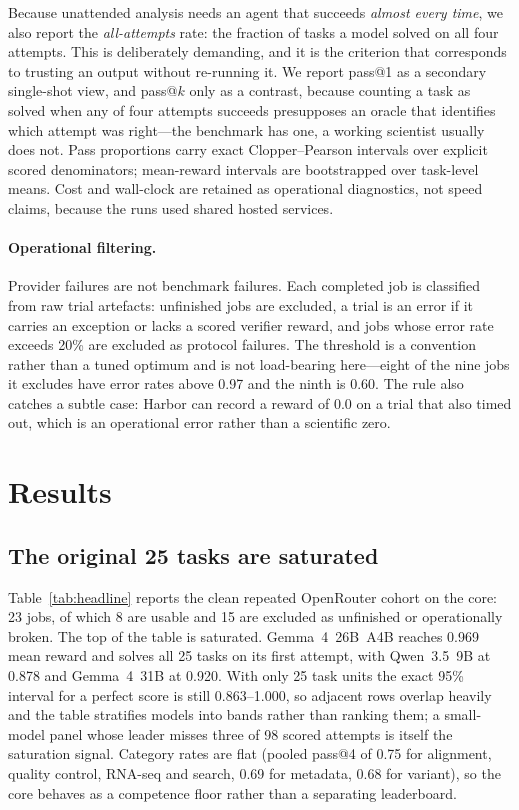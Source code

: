 \documentclass[11pt]{article}
\begin{document}
Because unattended analysis needs an agent that succeeds \emph{almost every time}, we also report the \emph{all-attempts} rate: the fraction of tasks a model solved on all four attempts.
This is deliberately demanding, and it is the criterion that corresponds to trusting an output without re-running it.
We report pass@1 as a secondary single-shot view, and pass@$k$ only as a contrast, because counting a task as solved when any of four attempts succeeds presupposes an oracle that identifies which attempt was right---the benchmark has one, a working scientist usually does not.
Pass proportions carry exact Clopper--Pearson intervals over explicit scored denominators; mean-reward intervals are bootstrapped over task-level means.
Cost and wall-clock are retained as operational diagnostics, not speed claims, because the runs used shared hosted services.

\paragraph{Operational filtering.}
Provider failures are not benchmark failures.
Each completed job is classified from raw trial artefacts: unfinished jobs are excluded, a trial is an error if it carries an exception or lacks a scored verifier reward, and jobs whose error rate exceeds 20\% are excluded as protocol failures.
The threshold is a convention rather than a tuned optimum and is not load-bearing here---eight of the nine jobs it excludes have error rates above 0.97 and the ninth is 0.60.
The rule also catches a subtle case: Harbor can record a reward of 0.0 on a trial that also timed out, which is an operational error rather than a scientific zero.

\section{Results}
\label{sec:results}

\subsection*{The original 25 tasks are saturated}

Table~\ref{tab:headline} reports the clean repeated OpenRouter cohort on the core: 23 jobs, of which 8 are usable and 15 are excluded as unfinished or operationally broken.
The top of the table is saturated.
Gemma~4~26B~A4B reaches 0.969 mean reward and solves all 25 tasks on its first attempt, with Qwen~3.5~9B at 0.878 and Gemma~4~31B at 0.920.
With only 25 task units the exact 95\% interval for a perfect score is still 0.863--1.000, so adjacent rows overlap heavily and the table stratifies models into bands rather than ranking them; a small-model panel whose leader misses three of 98 scored attempts is itself the saturation signal.
Category rates are flat (pooled pass@4 of 0.75 for alignment, quality control, RNA-seq and search, 0.69 for metadata, 0.68 for variant), so the core behaves as a competence floor rather than a separating leaderboard.
\end{document}
